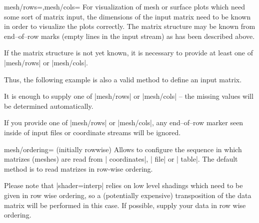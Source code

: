 \begin{pgfplotskeylist}{mesh/rows=,mesh/cols=}
	For visualization of mesh or surface plots which need some sort of matrix input, the dimensions of the input matrix need to be known in order to visualize the plots correctly. The matrix structure may be known from end--of--row marks (empty lines in the input stream) as has been described above.

	If the matrix structure is not yet known, it is necessary to provide at least one of |mesh/rows| or |mesh/cols|.

	Thus, the following example is also a valid method to define an input matrix.
\begin{codeexample}[]
\end{codeexample}

	It is enough to supply one of |mesh/rows| or |mesh/cols| -- the missing values will be determined automatically.
	
	If you provide one of |mesh/rows| or |mesh/cols|, any end--of--row marker seen inside of input files or coordinate streams will be ignored.
\end{pgfplotskeylist}
\begin{pgfplotskey}{mesh/ordering= (initially rowwise)}
	Allows to configure the sequence in which matrizes (meshes) are read from | coordinates|, | file| or | table|. The default method is to read matrizes in row-wise ordering.

	Please note that |shader=interp| relies on low level shadings which need to be given in row wise ordering, so a (potentially expensive) transposition of the data matrix will be performed in this case. If possible, supply your data in row wise ordering.
\end{pgfplotskey}


